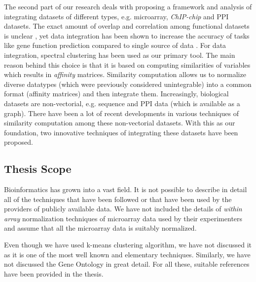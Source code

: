The second part of our research deals with proposing a framework and analysis of integrating datasets of different types, e.g. microarray, \textit{ChIP-chip} and PPI datasets. The exact amount of overlap and correlation among functional datasets is unclear \citep{werner2002comparative,kemmeren2002protein}, yet data integration has been shown to increase the accuracy of tasks like gene function prediction compared to single source of data \citep{ge01correlation,gerstein2002proteomics}. For data integration, spectral clustering has been used as our primary tool. The main reason behind this choice is that it is based on computing similarities of variables which results in \textit{affinity} matrices. Similarity computation allows us to normalize diverse datatypes (which were previously considered unintegrable) into a common format (affinity matrices) and then integrate them. Increasingly, biological datasets are non-vectorial, e.g. sequence and PPI data (which is available as a graph). There have been a lot of recent developments in various techniques of similarity computation among these non-vectorial datasets. With this as our foundation, two innovative techniques of integrating these datasets have been proposed.

\subsection{Thesis Scope}
Bioinformatics has grown into a vast field. It is not possible to describe in detail all of the techniques that have been followed or that have been used by the providers of publicly available data. We have not included the details of \textit{within array} normalization techniques of microarray data used by their experimenters and assume that all the microarray data is suitably normalized. 

Even though we have used k-means clustering algorithm, we have not discussed it as it is one of the most well known and elementary techniques. Similarly, we have not discussed the Gene Ontology in great detail. For all these, suitable references have been provided in the thesis.
